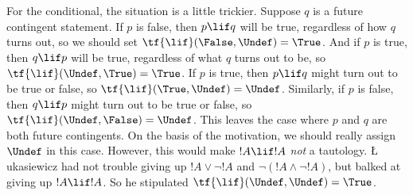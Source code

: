 \documentclass[../../../include/open-logic-section]{subfiles}
\begin{document}
For the conditional, the situation is a little trickier. Suppose $q$
is a future contingent statement. If $p$ is false, then $p \lif q$
will be true, regardless of how $q$ turns out, so we should set
$\tf{\lif}(\False, \Undef) = \True$. And if $p$ is true, then
$q \lif p$ will be true, regardless of what $q$ turns out to be, so
$\tf{\lif}(\Undef, \True) = \True$. If $p$ is true, then $p
\lif q$ might turn out to be true or false, so $\tf{\lif}(\True,
\Undef) = \Undef$. Similarly, if $p$ is false, then $q
\lif p$ might turn out to be true or false, so
$\tf{\lif}(\Undef, \False) = \Undef$. This leaves the
case where $p$ and $q$ are both future contingents. On the basis of
the motivation, we should really assign $\Undef$ in this case.
However, this would make $!A \lif !A$ \emph{not} a tautology. \L
ukasiewicz had not trouble giving up $!A \lor \lnot !A$ and $\lnot(!A
\land \lnot !A)$, but balked at giving up $!A \lif !A$. So he
stipulated $\tf{\lif}(\Undef, \Undef) =
\True$.
\end{document}

